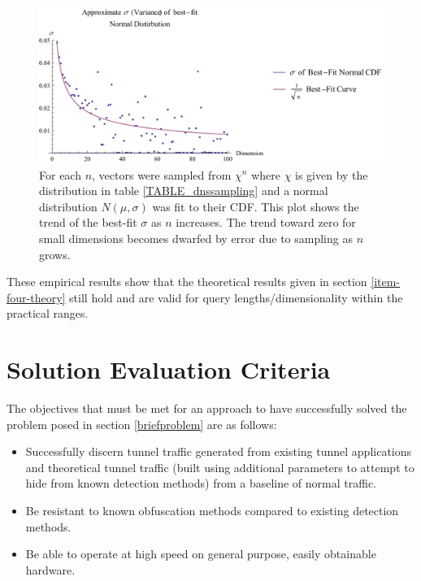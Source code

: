 \documentclass[12pt]{report}
\theoremstyle{remark}
\theoremstyle{definition}
\theoremstyle{definition}
\theoremstyle{definition}
\begin{document}
\begin{figure}
\centering
\includegraphics[width=\textwidth]{figures/dnssampling-sigmafit.pdf}
\caption[Trend of $\sigma$ of Best-Fit Normal Distribution of Sampled Expected Value]
{For each $n$, vectors were sampled from $\chi^n$ where $\chi$ is given by the
distribution in table \ref{TABLE_dnssampling} and a normal distribution
$N(\mu,\sigma)$ was fit to their CDF. This plot shows the trend of the best-fit
$\sigma$ as $n$ increases. The trend toward zero for small dimensions becomes
dwarfed by error due to sampling as $n$ grows.}
\label{dnssampling-sigmafit}
\end{figure}

These empirical results show that the theoretical results given in section
\ref{item-four-theory} still hold and are valid for query lengths/dimensionality
within the practical ranges.

\clearpage
\section{Solution Evaluation Criteria}

The objectives that must be met for an
approach to have successfully solved the problem posed in section
\ref{briefproblem} are as follows:

\begin{itemize}
\item Successfully discern tunnel traffic generated from
existing tunnel applications and theoretical tunnel traffic (built using
additional parameters to attempt to hide from known detection methods) from a
baseline of normal traffic.
\item Be resistant to known obfuscation methods compared to existing detection methods.
\item Be able to operate at high speed on general purpose, easily obtainable
hardware.
\end{itemize}
\end{document}
